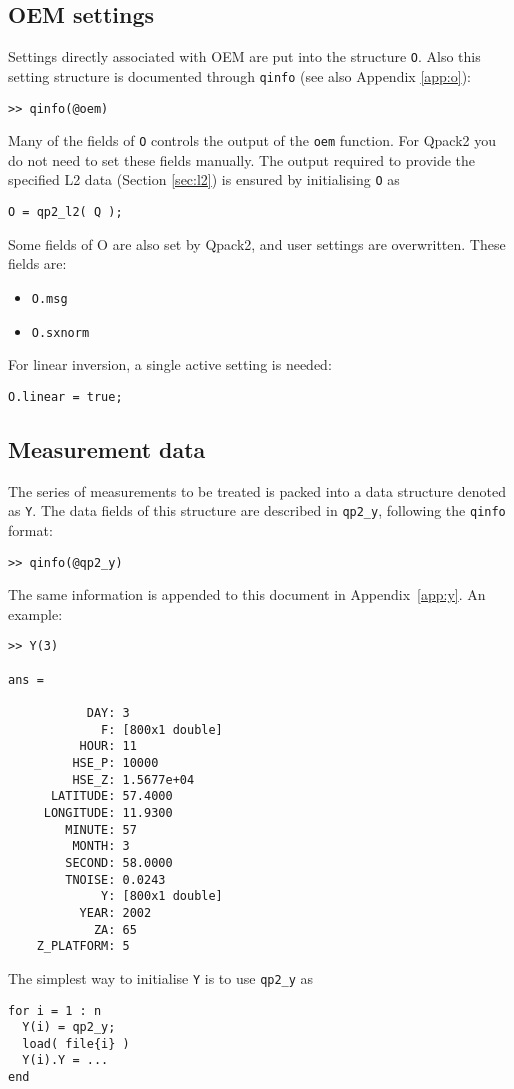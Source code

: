 \documentclass[a4paper,11pt]{article}
\begin{document}
\subsection{OEM settings}
\label{sec:O}
Settings directly associated with OEM are put into the structure \verb|O|. Also
this setting structure is documented through \verb|qinfo| (see also Appendix
\ref {app:o}):
\begin{verbatim}
>> qinfo(@oem)
\end{verbatim}
Many of the fields of \verb|O| controls the output of the \verb|oem| function.
For Qpack2 you do not need to set these fields manually. The output required to
provide the specified L2 data (Section \ref{sec:l2}) is ensured by initialising
\verb|O| as
\begin{verbatim}
O = qp2_l2( Q );
\end{verbatim}
Some fields of O are also set by Qpack2, and user settings are overwritten.
These fields are:
\begin{itemize}
\item \verb|O.msg|
\item \verb|O.sxnorm| 
\end{itemize}
For linear inversion, a single active setting is needed:
\begin{verbatim}
O.linear = true;
\end{verbatim}



\subsection{Measurement data}
\label{sec:Y}
The series of measurements to be treated is packed into a
data structure denoted as \verb|Y|. The data fields of this structure are
described in \verb|qp2_y|, following the \verb|qinfo| format:
\begin{verbatim}
>> qinfo(@qp2_y)
\end{verbatim}
The same information is appended to this document in
Appendix~\ref{app:y}. An example:
\begin{verbatim}
>> Y(3)

ans = 

           DAY: 3
             F: [800x1 double]
          HOUR: 11
         HSE_P: 10000
         HSE_Z: 1.5677e+04
      LATITUDE: 57.4000
     LONGITUDE: 11.9300
        MINUTE: 57
         MONTH: 3
        SECOND: 58.0000
        TNOISE: 0.0243
             Y: [800x1 double]
          YEAR: 2002
            ZA: 65
    Z_PLATFORM: 5
\end{verbatim}
The simplest way to initialise \verb|Y| is to use \verb|qp2_y| as
\begin{verbatim}
for i = 1 : n
  Y(i) = qp2_y;
  load( file{i} )
  Y(i).Y = ...
end
\end{verbatim}
\end{document}
